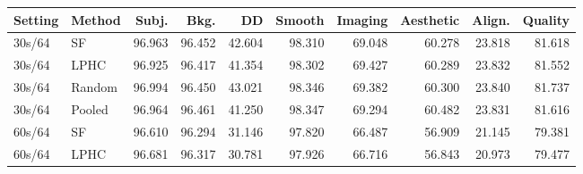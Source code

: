 \begin{tabular}{llrrrrrrrr}
\toprule
Setting & Method & Subj. & Bkg. & DD & Smooth & Imaging & Aesthetic & Align. & Quality \\
\midrule
30s/64 & SF & 96.963 & 96.452 & 42.604 & 98.310 & 69.048 & 60.278 & 23.818 & 81.618 \\
30s/64 & LPHC & 96.925 & 96.417 & 41.354 & 98.302 & 69.427 & 60.289 & 23.832 & 81.552 \\
30s/64 & Random & 96.994 & 96.450 & 43.021 & 98.346 & 69.382 & 60.300 & 23.840 & 81.737 \\
30s/64 & Pooled & 96.964 & 96.461 & 41.250 & 98.347 & 69.294 & 60.482 & 23.831 & 81.616 \\
60s/64 & SF & 96.610 & 96.294 & 31.146 & 97.820 & 66.487 & 56.909 & 21.145 & 79.381 \\
60s/64 & LPHC & 96.681 & 96.317 & 30.781 & 97.926 & 66.716 & 56.843 & 20.973 & 79.477 \\
\bottomrule
\end{tabular}
